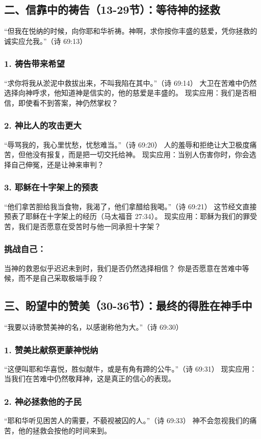\documentclass[a4paper, 12pt]{article}
\begin{document}
\subsection*{二、信靠中的祷告（13-29节）：等待神的拯救}
“但我在悦纳的时候，向你耶和华祈祷。神啊，求你按你丰盛的慈爱，凭你拯救的诚实应允我。”（诗 69:13）

\subsubsection*{1. 祷告带来希望}
“求你将我从淤泥中救拔出来，不叫我陷在其中。”（诗 69:14）
大卫在苦难中仍然选择向神呼求，他知道神是信实的，他的慈爱是丰盛的。
现实应用：我们是否相信，即使看不到答案，神仍然掌权？
\subsubsection*{2. 神比人的攻击更大}
“辱骂我的，我心里忧愁，忧愁难当。”（诗 69:20）
人的羞辱和拒绝让大卫极度痛苦，但他没有报复，而是把一切交托给神。
现实应用：当别人伤害你时，你会选择自己伸冤，还是让神来审判？
\subsubsection*{3. 耶稣在十字架上的预表}
“他们拿苦胆给我当食物，我渴了，他们拿醋给我喝。”（诗 69:21）
这节经文直接预表了耶稣在十字架上的经历（马太福音 27:34）。
现实应用：耶稣为我们的罪受苦，我们是否愿意在受苦时与他一同承担十字架？
\subsubsection*{挑战自己：}
当神的救恩似乎迟迟未到时，我们是否仍然选择相信？
你是否愿意在苦难中等候，而不是自己采取极端手段？
\subsection*{三、盼望中的赞美（30-36节）：最终的得胜在神手中}
“我要以诗歌赞美神的名，以感谢称他为大。”（诗 69:30）

\subsubsection*{1. 赞美比献祭更蒙神悦纳}
“这便叫耶和华喜悦，胜似献牛，或是有角有蹄的公牛。”（诗 69:31）
现实应用：当我们在苦难中仍然敬拜神，这是真正的信心的表现。
\subsubsection*{2. 神必拯救他的子民}
“耶和华听见困苦人的需要，不藐视被囚的人。”（诗 69:33）
神不会忽视我们的痛苦，他的拯救会按他的时间来到。
\end{document}
